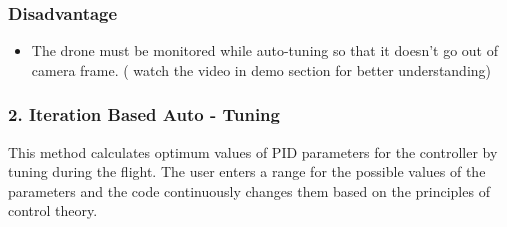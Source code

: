 \documentclass[a4paper,12pt,oneside]{book}
\begin{document}
\subsubsection{Disadvantage}
\begin{itemize}
    \item The drone must be monitored while auto-tuning so that it doesn't go out of camera frame.
    ( watch the video in demo section for better understanding)
\end{itemize}

  
   
   
  
    














































\subsubsection{2. Iteration Based Auto - Tuning}

This method calculates optimum values of PID parameters for the controller by tuning during the flight. The user enters a range for the possible values of the parameters and the code continuously changes them based on the principles of control theory.
\end{document}

